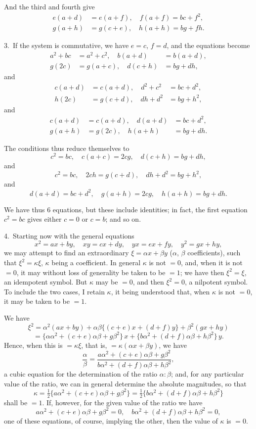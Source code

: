 \documentclass[11pt,a4paper]{article}
\theoremstyle{plain}
\theoremstyle{definition}
\theoremstyle{remark}
\begin{document}
And the third and fourth give
\begin{align*}
e(a + d) &= e(a + f),\quad f(a + f) = bc + f^2,\\
g(a + h) &= g(c + e),\quad h(a + h) = bg + fh.
\end{align*}

3.~If the system is commutative, we have $e = c$, $f = d$, and the equations become
\begin{align*}
a^2 + bc &= a^2 + c^2,\quad b(a + d) &= b(a + d),\\
g(2c) &= g(a + c),\quad d(c + h) &= bg + dh,
\end{align*}
and
\begin{align*}
c(a + d) &= c(a + d),\quad d^2 + c^2 &= bc + d^2,\\
h(2c) &= g(c + d),\quad dh + d^2 &= bg + h^2,
\end{align*}
and
\begin{align*}
c(a + d) &= c(a + d),\quad d(a + d) &= bc + d^2,\\
g(a + h) &= g(2c),\quad h(a + h) &= bg + dh.
\end{align*}

The conditions thus reduce themselves to
\[
c^2 = bc,\quad c(a + c) = 2cg,\quad d(c + h) = bg + dh,
\]
and
\[
c^2 = bc,\quad 2ch = g(c + d),\quad dh + d^2 = bg + h^2,
\]
and
\[
d(a + d) = bc + d^2,\quad g(a + h) = 2cg,\quad h(a + h) = bg + dh.
\]

We have thus 6 equations, but these include identities; in fact, the first equation $c^2 = bc$ gives either $c = 0$ or $c = b$; and so on.

4.~Starting now with the general equations
\[
x^2 = ax + by,\quad xy = cx + dy,\quad yx = ex + fy,\quad y^2 = gx + hy,
\]
we may attempt to find an extraordinary $\xi = \alpha x + \beta y$ ($\alpha$, $\beta$ coefficients), such that $\xi^2 = \kappa\xi$, $\kappa$ being a coefficient. In general $\kappa$ is not $=0$, and, when it is not $=0$, it may without loss of generality be taken to be $=1$; we have then $\xi^2 = \xi$, an idempotent symbol. But $\kappa$ may be $=0$, and then $\xi^2 = 0$, a nilpotent symbol. To include the two cases, I retain $\kappa$, it being understood that, when $\kappa$ is not $=0$, it may be taken to be $=1$.

We have
\[
\xi^2 = \alpha^2(ax+by) + \alpha\beta\{(c+e)x + (d+f)y\} + \beta^2(gx+hy)
\]
\[
= \{\alpha\alpha^2 + (c+e)\alpha\beta + g\beta^2\}\,x + \{b\alpha^2 + (d+f)\alpha\beta + h\beta^2\}\,y.
\]
Hence, when this is $=\kappa\xi$, that is, $=\kappa(\alpha x + \beta y)$, we have
\[
\frac{\alpha}{\beta} = \frac{a\alpha^2 + (c+e)\alpha\beta + g\beta^2}{b\alpha^2 + (d+f)\alpha\beta + h\beta^2},
\]
a cubic equation for the determination of the ratio $\alpha:\beta$; and, for any particular value of the ratio, we can in general determine the absolute magnitudes, so that
\[
\kappa = \tfrac{1}{2}\{a\alpha^2 + (c+e)\alpha\beta + g\beta^2\} = \tfrac{1}{2}\{b\alpha^2 + (d+f)\alpha\beta + h\beta^2\}
\]
shall be $=1$. If, however, for the given value of the ratio we have
\[
a\alpha^2 + (c+e)\alpha\beta + g\beta^2 = 0,\quad b\alpha^2 + (d+f)\alpha\beta + h\beta^2 = 0,
\]
one of these equations, of course, implying the other, then the value of $\kappa$ is $=0$.
\end{document}
